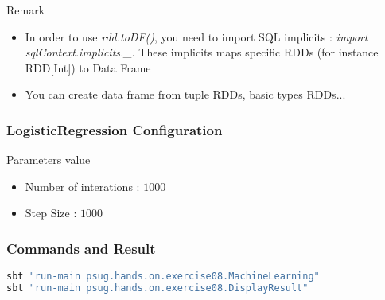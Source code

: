 \documentclass[slidetop,9pt,utf8]{beamer}
\begin{document}
\begin{CJK}{UTF8}{gbsn}
\begin{frame}
  \begin{block}{Remark}
    \begin{itemize}
      \item In order to use \textit{rdd.toDF()}, you need to import SQL implicits : \textit{import sqlContext.implicits.\_}. These implicits maps specific RDDs (for instance RDD[Int]) to Data Frame
      \item You can create data frame from tuple RDDs, basic types RDDs...
    \end{itemize}
  \end{block}

\end{frame}

\begin{frame}
  \frametitle{LogisticRegression Configuration}

  \begin{block}{Parameters value}
    \begin{itemize}
      \item Number of interations : $1000$
      \item Step Size : $1000$
    \end{itemize}
  \end{block}

\end{frame}

\begin{frame}[fragile]

  \frametitle{Commands and Result}
     
    \begin{lstlisting}[language=bash, style=terminal]
sbt "run-main psug.hands.on.exercise08.MachineLearning"
sbt "run-main psug.hands.on.exercise08.DisplayResult"    
    \end{lstlisting}


\end{frame}
\end{CJK}
\end{document}
